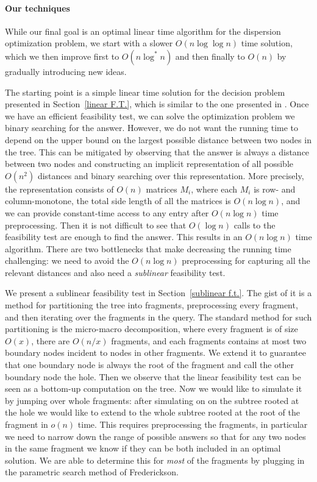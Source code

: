 \documentclass[11pt,a4paper]{article}
\theoremstyle{definition}
\theoremstyle{remark}
\begin{document}
\paragraph{Our techniques}
While our final goal is an optimal linear time algorithm for the dispersion optimization problem, we start
with a slower $O(n\log\log n)$ time solution, which we then improve first to $O(n\log^{*}n)$
and then finally to $O(n)$ by gradually introducing new ideas.

The starting point is a simple linear time solution for the decision problem presented in Section~\ref{linear F.T.}, 
which is similar to the one presented in \cite{Bhattacharya1991}.
Once we have an efficient feasibility test, we can solve the optimization problem we binary searching for the
answer. However, we do not want the running time to depend on the upper bound on the largest possible
distance between two nodes in the tree.  This can be mitigated by observing that the answer is always
a distance between two nodes and constructing an implicit representation
of all possible $O(n^{2})$ distances and binary searching over this representation. More precisely, the representation
consists of $O(n)$ matrices $M_{i}$, where each $M_{i}$ is row- and column-monotone, the total side length
of all the matrices is $O(n\log n)$, and we can provide constant-time access to any entry after $O(n\log n)$
time preprocessing. Then it is not difficult to see that $O(\log n)$ calls to the feasibility test are enough to
find the answer. This results in an $O(n\log n)$ time algorithm. There are two bottlenecks that make decreasing
the running time challenging: we need to avoid the $O(n\log n)$ preprocessing for capturing all the relevant
distances and also need a \emph{sublinear} feasibility test.

We present a sublinear feasibility test in Section~\ref{sublinear f.t.}. The gist of it is a method for partitioning
the tree into fragments, preprocessing every fragment, and then iterating over the fragments in the query.
The standard method for such partitioning is the micro-macro decomposition, where every fragment is
of size $O(x)$, there are $O(n/x)$ fragments, and each fragments contains at most two boundary nodes
incident to nodes in other fragments. We extend it to guarantee that one boundary node is always the
root of the fragment and call the other boundary node the hole. Then we observe that the linear feasibility test
can be seen as a bottom-up computation on the tree. Now we would like to simulate it by jumping over whole 
fragments: after simulating on on the subtree rooted at the hole we would like to extend to the whole
subtree rooted at the root of the fragment in $o(n)$ time. This requires preprocessing the fragments,
in particular we need to narrow down the range of possible answers so that for any two nodes in the same
fragment we know if they can be both included in an optimal solution. We are able to determine this
for \emph{most} of the fragments by plugging in the parametric search method of 
Frederickson\cite{Frederickson1991}. 
\end{document}

